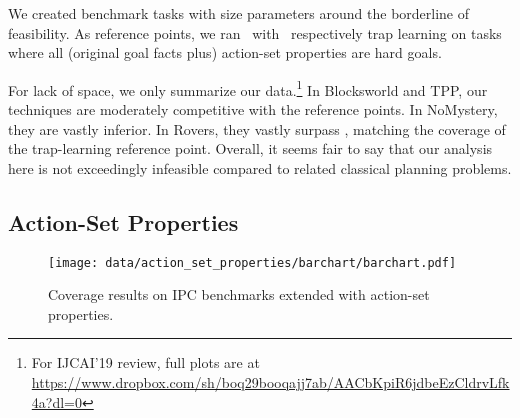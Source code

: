 We created benchmark tasks with size parameters around the borderline
of feasibility. As reference points, we ran \astar\ with \hlmcut\
respectively trap learning on tasks where all (original goal facts
plus) action-set properties are hard goals.

For lack of space, we only summarize our data.\footnote{For IJCAI'19
review, full plots are at
{\scriptsize \url{https://www.dropbox.com/sh/boq29booqajj7ab/AACbKpiR6jdbeEzCldrvLfk4a?dl=0}}}
%
%
In Blocksworld and TPP, our techniques are moderately competitive with
the reference points. In NoMystery, they are vastly inferior. In
Rovers, they vastly surpass \hlmcut, matching the coverage of the
trap-learning reference point. Overall, it seems fair to say that our
analysis here is not exceedingly infeasible compared to related
classical planning problems.




\fi









\ifdefined\longflagdefined

\subsection{Action-Set Properties}

\begin{figure*}[htb]
\centering\centering
%
\texttt{[image: data/action\_set\_properties/barchart/barchart.pdf]}
\vspace{-0.6cm}
\caption{Coverage results on IPC benchmarks extended with action-set properties.}
\label{fig:barcharts}
\vspace{-0.2cm}
\end{figure*}

